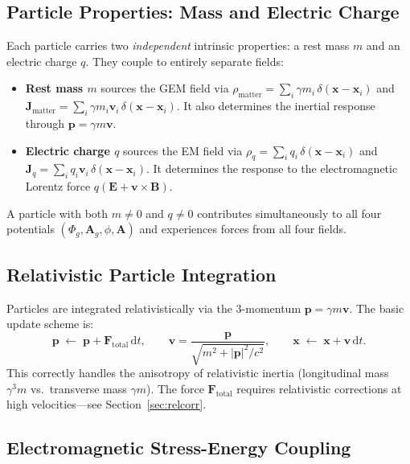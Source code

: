 \documentclass[11pt,a4paper]{article}
\newcommand{\vv}[1]{\mathbf{#1}}
\newcommand{\Phig}{\Phi_g}
\newcommand{\Ag}{\vv{A}_g}
\newcommand{\dd}{\mathrm{d}}
\begin{document}
\subsection{Particle Properties: Mass and Electric Charge}

Each particle carries two \emph{independent} intrinsic properties: a rest mass $m$ and an electric charge $q$.  They couple to entirely separate fields:
\begin{itemize}
  \item \textbf{Rest mass $m$} sources the GEM field via $\rho_{\mathrm{matter}} = \sum_i \gamma m_i\,\delta(\vv{x}-\vv{x}_i)$ and $\vv{J}_{\mathrm{matter}} = \sum_i \gamma m_i\vv{v}_i\,\delta(\vv{x}-\vv{x}_i)$.  It also determines the inertial response through $\vv{p} = \gamma m\vv{v}$.
  \item \textbf{Electric charge $q$} sources the EM field via $\rho_q = \sum_i q_i\,\delta(\vv{x}-\vv{x}_i)$ and $\vv{J}_q = \sum_i q_i\vv{v}_i\,\delta(\vv{x}-\vv{x}_i)$.  It determines the response to the electromagnetic Lorentz force $q(\vv{E}+\vv{v}\times\vv{B})$.
\end{itemize}
A particle with both $m\neq 0$ and $q\neq 0$ contributes simultaneously to all four potentials $(\Phig,\Ag,\phi,\vv{A})$ and experiences forces from all four fields.

\subsection{Relativistic Particle Integration}

Particles are integrated relativistically via the 3-momentum $\vv{p} = \gamma m\vv{v}$.  The basic update scheme is:
\begin{equation}
  \vv{p} \;\leftarrow\; \vv{p} + \vv{F}_{\mathrm{total}}\,\dd t, \qquad
  \vv{v} = \frac{\vv{p}}{\sqrt{m^2 + |\vv{p}|^2/c^2}}, \qquad
  \vv{x} \;\leftarrow\; \vv{x} + \vv{v}\,\dd t.
\end{equation}
This correctly handles the anisotropy of relativistic inertia (longitudinal mass $\gamma^3 m$ vs.\ transverse mass $\gamma m$).  The force $\vv{F}_{\mathrm{total}}$ requires relativistic corrections at high velocities---see Section~\ref{sec:relcorr}.

\subsection{Electromagnetic Stress-Energy Coupling}
\end{document}
